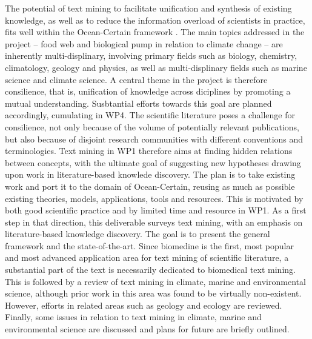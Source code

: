 The potential of text mining to facilitate unification and synthesis of existing knowledge, as well as to reduce the information overload of scientists in practice, fits well within the Ocean-Certain framework \citep{Olsen2013Ocean}.
The main topics addressed in the project -- food web and biological pump in relation to climate change -- are inherently multi-displinary, involving primary fields such as biology, chemistry, climatology, geology and physics, as well as  multi-displinary fields such as marine science and climate science.
A central theme in the project is therefore consilience, that is, unification of knowledge across diciplines by promoting a mutual understanding.
Susbtantial efforts towards this goal are planned accordingly, cumulating in WP4.
The scientific literature poses a challenge for consilience, not only because of the volume of potentially relevant publications, but also because of disjoint research communities with different conventions and terminologies.
Text mining in WP1 therefore aims at finding hidden relations between concepts, with the ultimate goal of suggesting new hypotheses drawing upon work in literature-based knowlede discovery.
The plan is to take existing work and port it to the domain of Ocean-Certain, reusing as much as possible existing theories, models, applications, tools and resources.
This is motivated by both good scientific practice and by limited time and resource in WP1.
As a first step in that direction, this deliverable surveys text mining, with an emphasis on literature-based knowledge discovery.
The goal is to present the general framework and the state-of-the-art.
Since biomedine is the first, most popular and most advanced application area for text mining of scientific literature, a substantial part of the text is necessarily dedicated to biomedical text mining.
This is followed by a review of text mining in climate, marine and environmental science, although prior work in this area was found to be virtually non-existent. 
However, efforts in related areas such as geology and ecology are reviewed.
Finally, some issues in relation to text mining in climate, marine and environmental science are discussed and plans for future are briefly outlined.

